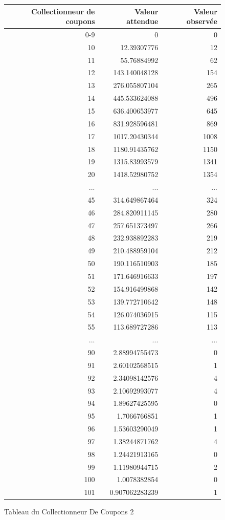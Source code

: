 \documentclass[10pt,a4paper]{article}
\begin{document}
\begin{figure}[h]
		\centering
\begin{tabular}{|r|r|r|}
\hline
Collectionneur de coupons & Valeur attendue & Valeur observée\\
\hline
0-9 & 0 & 0\\
10 & 12.39307776 & 12\\
11 & 55.76884992 & 62\\
12 & 143.140048128 & 154\\
13 & 276.055807104 & 265\\
14 & 445.533624088 & 496\\
15 & 636.400653977 & 645\\
16 & 831.928596481 & 869\\
17 & 1017.20430344 & 1008\\
18 & 1180.91435762 & 1150\\
19 & 1315.83993579 & 1341\\
20 & 1418.52980752 & 1354\\
... & ... & ...\\
45 & 314.649867464 & 324\\
46 & 284.820911145 & 280\\
47 & 257.651373497 & 266\\
48 & 232.938892283 & 219\\
49 & 210.488959104 & 212\\
50 & 190.116510903 & 185\\
51 & 171.646916633 & 197\\
52 & 154.916499868 & 142\\
53 & 139.772710642 & 148\\
54 & 126.074036915 & 115\\
55 & 113.689727286 & 113\\
... & ... & ...\\
90 & 2.88994755473 & 0\\
91 & 2.60102568515 & 1\\
92 & 2.34098142576 & 4\\
93 & 2.10692993077 & 4\\
94 & 1.89627425595 & 0\\
95 & 1.7066766851 & 1\\
96 & 1.53603290049 & 1\\
97 & 1.38244871762 & 4\\
98 & 1.24421913165 & 0\\
99 & 1.11980944715 & 2\\
100 & 1.0078382854 & 0\\
101 & 0.907062283239 & 1\\
\hline
\end{tabular}
\caption{Tableau du Collectionneur De Coupons 2}
	\end{figure}
\end{document}
